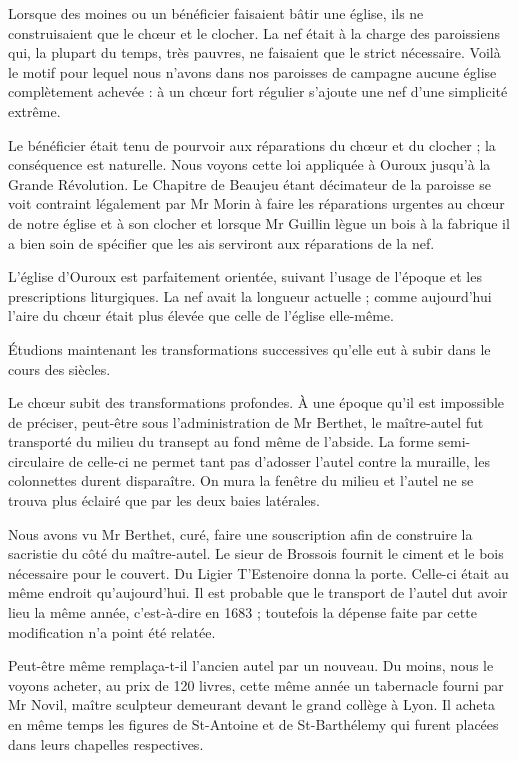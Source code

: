Lorsque des moines ou un bénéficier faisaient bâtir une église, ils ne construisaient que le chœur et le clocher. La nef était à la charge des paroissiens qui, la plupart du temps, très pauvres, ne faisaient que le strict nécessaire. Voilà le motif pour lequel nous n'avons dans nos paroisses de campagne aucune église complètement achevée : à un chœur fort régulier s'ajoute une nef d'une simplicité extrême.

Le bénéficier était tenu de pourvoir aux réparations du chœur et du clocher ; la conséquence est naturelle. Nous voyons cette loi appliquée à Ouroux jusqu'à la Grande Révolution. Le Chapitre de Beaujeu étant décimateur de la paroisse se voit contraint légalement par Mr Morin à faire les réparations urgentes au chœur de notre église et à son clocher et lorsque Mr Guillin lègue un bois à la fabrique il a bien soin de spécifier que les ais serviront aux réparations de la nef.

L'église d'Ouroux est parfaitement orientée, suivant l'usage de l'époque et les prescriptions liturgiques. La nef avait la longueur actuelle ; comme aujourd'hui l'aire du chœur était plus élevée que celle de l'église elle-même.

Étudions maintenant les transformations successives qu'elle eut à subir dans le cours des siècles.

Le chœur subit des transformations profondes. À une époque qu'il est impossible de préciser, peut-être sous l'administration de Mr Berthet, le maître-autel fut transporté du milieu du transept au fond même de l'abside. La forme semi-circulaire de celle-ci ne permet
tant pas d'adosser l'autel contre la muraille, les colonnettes durent disparaître. On mura la fenêtre du milieu et l'autel ne se trouva plus éclairé que par les deux baies latérales.

Nous avons vu Mr Berthet, curé, faire une souscription afin de construire la sacristie du côté du maître-autel. Le sieur de Brossois fournit le ciment et le bois nécessaire pour le couvert. Du Ligier T'Estenoire donna la porte. Celle-ci était au même endroit qu'aujourd'hui. Il est probable que le transport de l'autel dut avoir lieu la même année, c'est-à-dire en 1683 ; toutefois la dépense faite par cette modification n'a point été relatée.

Peut-être même remplaça-t-il l'ancien autel par un nouveau. Du moins, nous le voyons acheter, au prix de 120 livres, cette même année un tabernacle fourni par Mr Novil, maître sculpteur demeurant devant le grand collège à Lyon. Il acheta en même temps les figures de St-Antoine et de St-Barthélemy qui furent placées dans leurs chapelles respectives.

